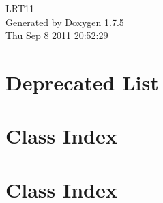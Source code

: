 \documentclass[a4paper]{book}
\begin{document}
\hypersetup{pageanchor=false,citecolor=blue}
\begin{titlepage}
\vspace*{7cm}
\begin{center}
{\Large \-L\-R\-T11 }\\
\vspace*{1cm}
{\large \-Generated by Doxygen 1.7.5}\\
\vspace*{0.5cm}
{\small Thu Sep 8 2011 20:52:29}\\
\end{center}
\end{titlepage}
\clearemptydoublepage
{}
\tableofcontents
\clearemptydoublepage
{}
\hypersetup{pageanchor=true,citecolor=blue}
\chapter{\-Deprecated \-List}
\label{deprecated}
\hypertarget{deprecated}{}

\chapter{\-Class \-Index}

\chapter{\-Class \-Index}

\end{document}
